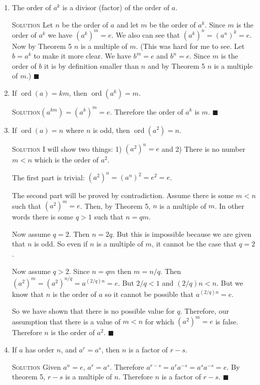 \documentclass[twoside]{amsart}
\newcommand{\solution}{\textsc{Solution}\xspace}
\newcommand{\blank}{\vspace{5pt}}
\renewcommand{\qed}{\blacksquare}
\newcommand{\itm}{\blank\item}
\newcommand{\sol}{\blank\noindent\solution}
\newcommand{\ord}{\mathop{\mathrm{ord}}}
\begin{document}
\begin{enumerate}[A.]
\begin{enumerate}[1]
      \itm The order of $a^k$ is a divisor (factor) of the order of $a$.

      \sol Let $n$ be the order of $a$ and let $m$ be the order of 
      $a^k$. Since $m$ is the order of $a^k$ we have 
      $(a^k)^m = e$. We also can see that $(a^k)^n = (a^n)^k = e$.
      Now by Theorem 5 $n$ is a multiple of $m$. (This was hard for 
      me to see. Let $b = a^k$ to make it more clear. We have
      $b^m = e$ and $b^n = e$. Since $m$ is the order of $b$ it
      is by definition smaller than $n$ and by Theorem 5 $n$ is a 
      multiple of $m$.) $\qed$

      \itm If $\ord(a) = km$, then $\ord(a^k) = m$.

      \sol $(a^{km}) = (a^k) ^m = e$. Therefore the order of $a^k$ is $m$.
      $\qed$

      \itm If $\ord(a) = n$ where $n$ is odd, then $\ord(a^2) = n$.

      \sol I will show two things: 1) $(a^2)^n = e$ and 2)
      There is no number $m < n$ which is the order of $a^2$.

      The first part is trivial: $(a^2)^n = (a^n)^2 = e^2 = e$.

      The second part will be proved by contradiction. Assume there is
      some $m < n$ such that $(a^2)^m = e$. Then, by Theorem 5, $n$
      is a multiple of $m$. In other words there is some $q > 1$ 
      such that $n = qm$.

      Now assume $q=2$. Then $n=2q$. But this is impossible because we
      are given that $n$ is odd. So even if $n$ is a multiple of $m$, 
      it cannot be the case that $q=2$.

      Now assume $q > 2$. Since $n=qm$ then $m=n/q$.
      Then  $(a^2)^m = (a^2)^{n/q} = a^{(2/q)n} = e$. But $2/q < 1$
      and $(2/q)n < n$.  But we know that $n$ is the order of $a$
      so it cannot be possible that $a^{(2/q)n} = e$.

      So we have shown that there is no possible value for $q$. Therefore,
      our assumption that there is a value of $m < n$ for which
      $(a^2)^m = e$ is false. Therefore $n$ is the order of $a^2$. $\qed$
      
      \itm If $a$ has order $n$, and $a^r = a^s$, then $n$ is a factor
      of $r-s$.

      \sol Given $a^n = e$, $a^r = a^s$. Therefore
      $a^{r-s} = a^r a^{-s} = a^s a^{-s} = e$. By theorem 5, $r-s$ is
      a multiple of $n$. Therefore $n$ is a factor of $r-s$. $\qed$


\end{enumerate}
\end{enumerate}
\end{document}

